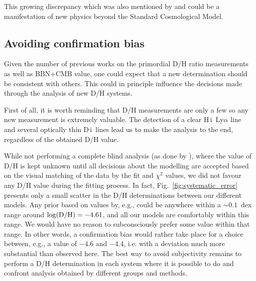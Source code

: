 \documentclass[fleqn,usenatbib]{mnras}
\newcommand{\SB}[1]{{\color{OrangeRed} SB:~ #1}}
\newcommand{\PK}[1]{{\color{cyan} PK:~ #1}}
\newcommand{\DI}[0]{D\,{\sc i}}
\newcommand{\HI}[0]{H\,{\sc i}}
\begin{document}
This growing discrepancy which was also mentioned by \cite{Cooke_2018} and \cite{Pitrou2021} could be a manifestation of new physics beyond the Standard Cosmological Model. 


\subsection{Avoiding confirmation bias}
\label{sec:confirmation_bias}

Given the number of previous works on the primordial D/H ratio measurements as well as BBN+CMB value, one could expect that a new determination should be consistent with others. This could in principle influence the decisions made through the analysis of new D/H systems. 

First of all, it is worth reminding that D/H measurements are only a few so any new measurement is extremely valuable. The detection of a clear \HI\ Ly$\alpha$ line and several optically thin \DI\ lines lead us to make the analysis to the end, regardless of the obtained D/H value. 

While not performing a complete blind analysis (as done by \citealt{Cooke_2014}), where the value of D/H is kept unknown until 
all decisions about the modelling are accepted based on the visual matching of the data by the fit and $\chi^2$ values, we did not favour any D/H value during the fitting process.
In fact, Fig.~\ref{fig:systematic_error} presents only a small scatter in the D/H determinations between our different models. Any prior based on values by, e.g., \citet{Cooke_2018} could be anywhere within a $\sim 0.1$~dex range around $\log ({\rm D/H})=-4.61$, and all our models are comfortably within this range. We would have no reason to subconsciously prefer some value within that range. In other words, a confirmation bias would rather take place for a choice between, e.g., a value of $-4.6$ and $-4.4$, i.e. with a deviation much more substantial than observed here. The best way to avoid subjectivity remains to perform a D/H determination in each system where it is possible to do and confront analysis obtained by different groups and methods.
\end{document}
